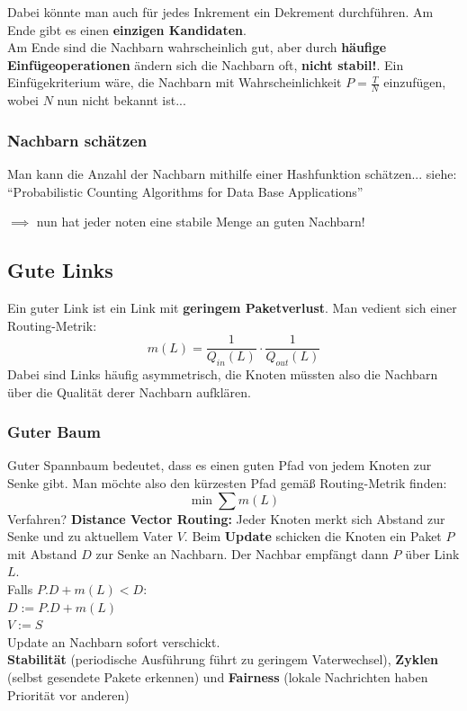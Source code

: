 \documentclass[a4paper]{article}
\begin{document}
Dabei könnte man auch für jedes Inkrement ein Dekrement durchführen. Am Ende gibt es einen \textbf{einzigen Kandidaten}.\\

Am Ende sind die Nachbarn wahrscheinlich gut, aber durch \textbf{häufige Einfügeoperationen } ändern sich die Nachbarn oft, \textbf{nicht stabil!}.
Ein Einfügekriterium wäre, die Nachbarn mit Wahrscheinlichkeit $P=\frac{T}{N}$ einzufügen, wobei $N$ nun nicht bekannt ist...
\subsubsection{Nachbarn schätzen}
Man kann die Anzahl der Nachbarn mithilfe einer Hashfunktion schätzen... siehe:\\
``Probabilistic Counting Algorithms for Data Base Applications''

$\implies$ nun hat jeder noten eine stabile Menge an guten Nachbarn!

\subsection{Gute Links}
Ein guter Link ist ein Link mit \textbf{geringem Paketverlust}. Man vedient sich einer Routing-Metrik:
$$m(L)= \frac{1}{Q_{in}(L)} \cdot \frac{1}{Q_{out}(L)}$$
Dabei sind Links häufig asymmetrisch, die Knoten müssten also die Nachbarn über die Qualität derer Nachbarn aufklären.\\

\subsubsection{Guter Baum}
Guter Spannbaum bedeutet, dass es einen guten Pfad von jedem Knoten zur Senke gibt. Man möchte also den kürzesten Pfad gemäß Routing-Metrik finden:
$$\min \sum m(L)$$
Verfahren? \textbf{Distance Vector Routing:} Jeder Knoten merkt sich Abstand zur Senke und zu aktuellem Vater $V$. Beim \textbf{Update} schicken die Knoten ein Paket $P$ mit Abstand $D$ zur Senke an Nachbarn. Der Nachbar empfängt dann $P$ über Link $L$.\\
Falls $P.D + m(L) < D$:\\
$D := P.D+m(L)$\\
$V := S$\\
Update an Nachbarn sofort verschickt.\\

\textbf{Stabilität} (periodische Ausführung führt zu geringem Vaterwechsel), \textbf{Zyklen} (selbst gesendete Pakete erkennen) und \textbf{Fairness} (lokale Nachrichten haben Priorität vor anderen)
	
\end{document}
